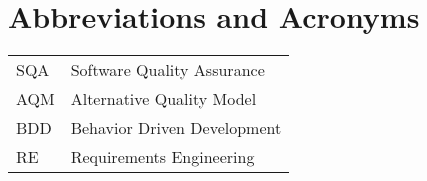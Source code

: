 \chapter*{Abbreviations and Acronyms}


\noindent
\begin{longtable}{@{}p{}p{}@{}}
SQA & Software Quality Assurance \\
AQM & Alternative Quality Model \\
BDD & Behavior Driven Development \\
RE & Requirements Engineering \\

\end{longtable}
